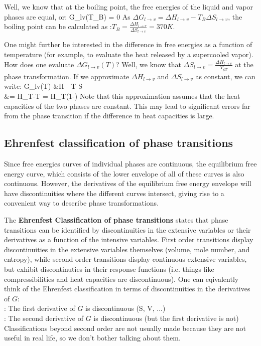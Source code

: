 \documentclass[12pt]{article}
\begin{document}
Well, we know that at the boiling point, the free energies of the liquid and vapor phases are equal, or:
\eqs
\Delta G_{l\rightarrow v}(T_B) = 0
\eqe
 As $\Delta G_{l\rightarrow v} = \Delta H_{l\rightarrow v}-T_B \Delta S_{l\rightarrow v}$, the boiling point can be calculated as :$T_B = \frac{\Delta H_{l\rightarrow v}}{\Delta S_{l\rightarrow v}} = 370 K$.

One might further be interested in the difference in free energies as a function of temperature (for example, to evaluate the heat released by a supercooled vapor). How does one evaluate $\Delta G_{l\rightarrow v}(T)$?  Well, we know that $\Delta S_{l\rightarrow v} = \frac{\Delta H_{l\rightarrow v}}{T_{\phi T}}$ at the phase transformation. If we approximate $\Delta H_{l\to v}$ and $\Delta S_{l\to v}$ as constant, we can write:
\eqs
\Delta G_{l\rightarrow v}(T) &\approx \Delta H - T \Delta S\\
&= \Delta H_{\phi T}-T = \Delta H_{\phi T}(1-)
\eqe
Note that this approximation assumes that the heat capacities of the two phases are constant. This may lead to significant errors far from the phase transition if the difference in heat capacities is large.

\subsection{Ehrenfest classification of phase transitions}
Since free energies curves of individual phases are continuous, the equilibrium free energy curve, which consists of the lower envelope of all of these curves is also continuous. However, the derivatives of the equilibrium free energy envelope will have discontinuities where the different curves intersect, giving rise to a convenient way to describe phase transformations. 

The \textbf{Ehrenfest Classification of phase transitions} states that phase transitions can be identified by discontinuities in the extensive variables or their derivatives as a function of the intensive variables. First order transitions display discontinuities in the extensive variables themselves (volume, mole number, and entropy), while second order transitions display continuous extensive variables, but exhibit discontinuties in their response functions (i.e. things like compressibilities and heat capacities are discontinuous). One can eqivalently think of the Ehrenfest classification in terms of discontinuities in the derivatives of $G$:\\
:  The first derivative of $G$ is discontinuous (S, V, ...)\\
:  The second derivative of $G$ is discontinuous (but the first derivative is not)\\
Classifications beyond second order are not usually made because they are not useful in real life, so we don't bother talking about them.
\end{document}
